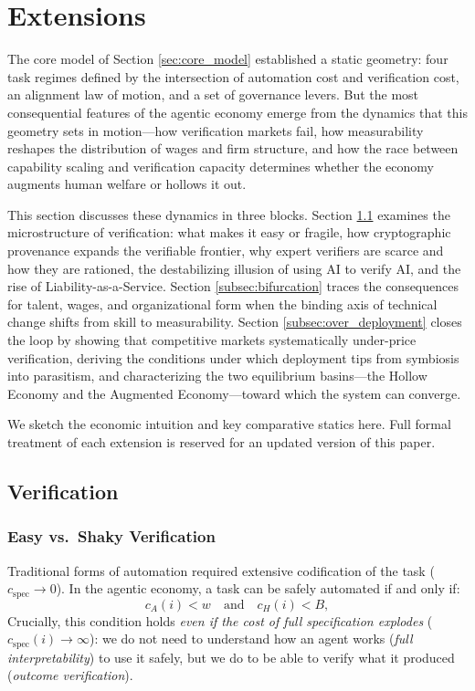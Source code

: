 \documentclass[12pt, letter]{article}
\begin{document}
\clearpage
\section{Extensions}\label{sec:extensions}

The core model of Section \ref{sec:core_model} established a static geometry: four task regimes defined by the intersection of automation cost and verification cost, an alignment law of motion, and a set of governance levers. But the most consequential features of the agentic economy emerge from the dynamics that this geometry sets in motion---how verification markets fail, how measurability reshapes the distribution of wages and firm structure, and how the race between capability scaling and verification capacity determines whether the economy augments human welfare or hollows it out. 

This section discusses these dynamics in three blocks. Section \ref{subsec:block1} examines the microstructure of verification: what makes it easy or fragile, how cryptographic provenance expands the verifiable frontier, why expert verifiers are scarce and how they are rationed, the destabilizing illusion of using AI to verify AI, and the rise of Liability-as-a-Service. Section \ref{subsec:bifurcation} traces the consequences for talent, wages, and organizational form when the binding axis of technical change shifts from skill to measurability. Section \ref{subsec:over_deployment} closes the loop by showing that competitive markets systematically under-price verification, deriving the conditions under which deployment tips from symbiosis into parasitism, and characterizing the two equilibrium basins---the Hollow Economy and the Augmented Economy---toward which the system can converge.

We sketch the economic intuition and key comparative statics here. Full formal treatment of each extension is reserved for an updated version of this paper.



\subsection{Verification}
\label{subsec:block1}

\subsubsection{Easy vs.\ Shaky Verification}

Traditional forms of automation required extensive codification of the task ($c_{\mathrm{spec}} \to 0$). In the agentic economy, a task can be safely automated if and only if:
\[
c_A(i) < w \quad \text{and} \quad c_H(i) < B,
\]
Crucially, this condition holds \emph{even if the cost of full specification explodes} ($c_{\mathrm{spec}}(i)\to\infty$): we do not need to understand how an agent works (\emph{full interpretability}) to use it safely, but we do to be able to verify what it produced (\emph{outcome verification}). 
\end{document}
